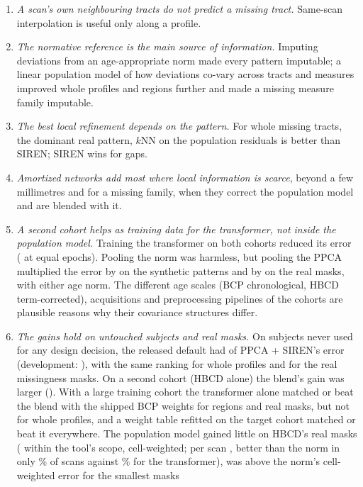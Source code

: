 \documentclass[11pt]{article}
\begin{document}
\begin{enumerate}
\item \emph{A scan's own neighbouring tracts do not predict a missing tract.} Same-scan interpolation is useful only along
a profile.
\item \emph{The normative reference is the main source of information.} Imputing deviations from an age-appropriate
norm made every pattern imputable; a linear population model of how deviations co-vary across tracts and measures
improved whole profiles and regions further and made a missing measure family imputable.
\item \emph{The best local refinement depends on the pattern.} For whole missing tracts, the dominant real pattern, $k$NN
on the population residuals is better than SIREN; SIREN wins for gaps.
\item \emph{Amortized networks add most where local information is scarce}, beyond a few millimetres and for a
missing family, when they correct the population model and are blended with it.
\item \emph{A second cohort helps as training data for the transformer, not inside the population model.} Training the
transformer on both cohorts reduced its error (\pbDAll{} at equal epochs). Pooling the norm was harmless, but pooling the
PPCA multiplied the error by \eFiveB{} on the synthetic patterns and by \eFiveRealB{} on the real masks, with either age
norm. The different age scales (BCP chronological, HBCD term-corrected), acquisitions and preprocessing pipelines of the
cohorts are plausible reasons why their covariance structures differ.
\item \emph{The gains hold on untouched subjects and real masks.} On subjects never used for any design decision, the
released default had \eOneFinalVsDef{} of PPCA + SIREN's error (development: \cORatio), with the same ranking for whole
profiles and for the real missingness masks. On a second cohort (HBCD alone) the blend's gain was larger
(\eThreeFinalVsDef). With a large training cohort the transformer alone matched or beat the blend with the shipped BCP weights for
regions and real masks, but not for whole profiles, and a weight table refitted on the target cohort matched or beat it
everywhere. The population model gained little on HBCD's real masks (\rmThreeDefIn{} within the tool's scope, cell-weighted; per
scan \rmThreeScanInDef, better than the norm in only \rmThreeScanInDefBetter\% of scans against
\rmThreeScanInTfBetter\% for the transformer), was above the norm's cell-weighted error for the smallest masks

\end{enumerate}
\end{document}

